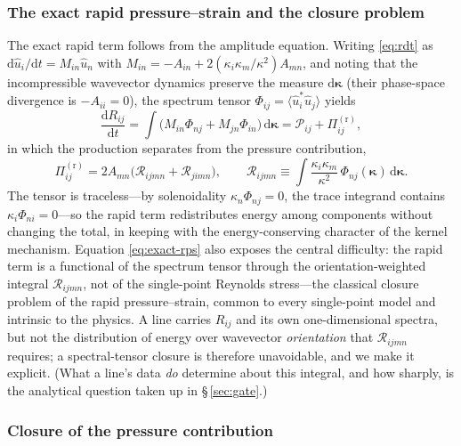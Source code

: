 \documentclass[lineno]{JFM-FLM_Au}
\begin{document}
\subsubsection{The exact rapid pressure--strain and the closure problem}
\label{sec:closure-problem}

The exact rapid term follows from the amplitude equation. Writing
\eqref{eq:rdt} as $\mathrm{d}\hat u_i/\mathrm{d}t=M_{in}\hat u_n$ with
$M_{in}=-A_{in}+2(\kappa_i\kappa_m/\kappa^2)A_{mn}$, and noting that the
incompressible wavevector dynamics preserve the measure
$\mathrm{d}\boldsymbol{\kappa}$ (their phase-space divergence is
$-A_{ii}=0$), the spectrum tensor
$\Phi_{ij}=\langle\hat u_i^{*}\hat u_j\rangle$ yields
\begin{equation}
  \frac{\mathrm{d}R_{ij}}{\mathrm{d}t}
  = \int\!\big(M_{in}\Phi_{nj}+M_{jn}\Phi_{in}\big)\,
    \mathrm{d}\boldsymbol{\kappa}
  = \mathcal{P}_{ij} + \Pi^{(\mathrm r)}_{ij},
  \label{eq:dRdt-rdt}
\end{equation}
in which the production separates from the pressure contribution,
\begin{equation}
  \Pi^{(\mathrm r)}_{ij}
  = 2A_{mn}\big(\mathcal{R}_{ijmn}+\mathcal{R}_{jimn}\big),
  \qquad
  \mathcal{R}_{ijmn} \equiv
  \int \frac{\kappa_i \kappa_m}{\kappa^2}\,
  \Phi_{nj}(\boldsymbol{\kappa})\,\mathrm{d}\boldsymbol{\kappa}.
  \label{eq:exact-rps}
\end{equation}
The tensor is traceless---by solenoidality $\kappa_n\Phi_{nj}=0$, the
trace integrand contains $\kappa_i\Phi_{ni}=0$---so the rapid term
redistributes energy among components without changing the total, in
keeping with the energy-conserving character of the kernel mechanism.
Equation \eqref{eq:exact-rps} also exposes the central difficulty: the
rapid term is a functional of the spectrum tensor through the
orientation-weighted integral $\mathcal{R}_{ijmn}$, not of the
single-point Reynolds stress---the classical closure problem of the rapid
pressure--strain, common to every single-point model
\citep{Crow1968,LaunderReeceRodi1975,Pope2000} and intrinsic to the
physics. A line carries $R_{ij}$ and its own one-dimensional spectra, but
not the distribution of energy over wavevector \emph{orientation} that
$\mathcal{R}_{ijmn}$ requires; a spectral-tensor closure is therefore
unavoidable, and we make it explicit. (What a line's data \emph{do}
determine about this integral, and how sharply, is the analytical
question taken up in \S\,\ref{sec:gate}.)

\subsubsection{Closure of the pressure contribution}\label{sec:iso-closure}
\end{document}
